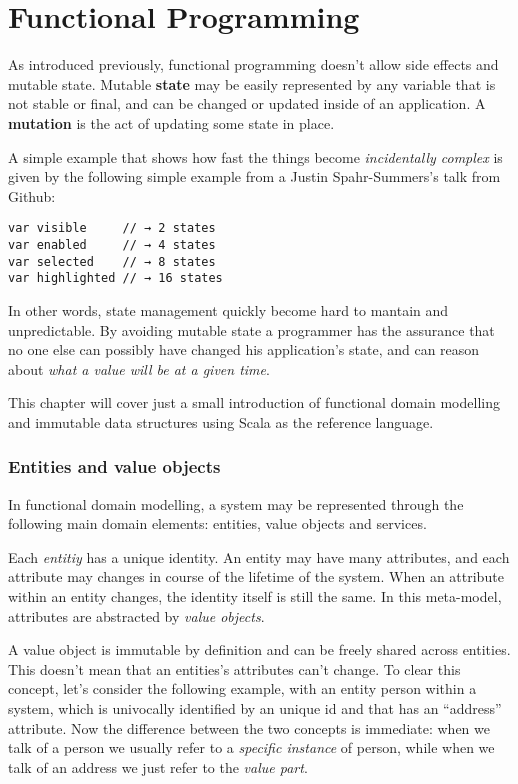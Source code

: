 \chapter{Functional Programming}\label{functional-programming}

As introduced previously, functional programming doesn't allow side
effects and mutable state. Mutable \textbf{state} may be easily
represented by any variable that is not stable or final, and can be
changed or updated inside of an application. A \textbf{mutation} is the
act of updating some state in place.

A simple example that shows how fast the things become
\emph{incidentally complex} is given by the following simple example
from a Justin Spahr-Summers's talk from Github:

\begin{verbatim}
var visible     // → 2 states
var enabled     // → 4 states
var selected    // → 8 states
var highlighted // → 16 states
\end{verbatim}

In other words, state management quickly become hard to mantain and
unpredictable. By avoiding mutable state a programmer has the assurance
that no one else can possibly have changed his application's state, and
can reason about \emph{what a value will be at a given time}.

This chapter will cover just a small introduction of functional domain
modelling and immutable data structures using Scala as the reference
language.

\subsection{Entities and value
objects}\label{entities-and-value-objects}

In functional domain modelling, a system may be represented through the
following main domain elements: entities, value objects and services.

Each \emph{entitiy} has a unique identity. An entity may have many
attributes, and each attribute may changes in course of the lifetime of
the system. When an attribute within an entity changes, the identity
itself is still the same. In this meta-model, attributes are abstracted
by \emph{value objects}.

A value object is immutable by definition and can be freely shared
across entities. This doesn't mean that an entities's attributes can't
change. To clear this concept, let's consider the following example,
with an entity person within a system, which is univocally identified by
an unique id and that has an ``address'' attribute. Now the difference
between the two concepts is immediate: when we talk of a person we
usually refer to a \emph{specific instance} of person, while when we
talk of an address we just refer to the \emph{value part}.

